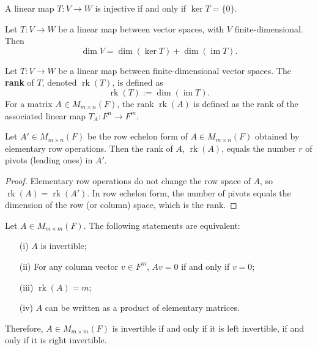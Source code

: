 \begin{proposition}
  A linear map $T: V \to W$ is injective if and only if $\ker T = \{0\}$.
\end{proposition}

\begin{theorem}
  Let $T: V \to W$ be a linear map between vector spaces, with $V$ finite-dimensional. Then
  \[
    \dim V = \dim (\ker T) + \dim (\operatorname{im} T).
  \]
\end{theorem}

\begin{definition}[Rank]
  Let $T: V \to W$ be a linear map between finite-dimensional vector spaces. The \textbf{rank} of $T$, denoted $\operatorname{rk}(T)$, is defined as
  \[
    \operatorname{rk}(T) := \dim(\operatorname{im} T).
  \]
  For a matrix $A \in M_{m \times n}(F)$, the rank $\operatorname{rk}(A)$ is defined as the rank of the associated linear map $T_A: F^n \to F^m$.
\end{definition}

\begin{proposition}
  Let $A' \in M_{m \times n}(F)$ be the row echelon form of $A \in M_{m \times n}(F)$ obtained by elementary row operations. Then the rank of $A$, $\operatorname{rk}(A)$, equals the number $r$ of pivots (leading ones) in $A'$.
\end{proposition}

\begin{proof}
  Elementary row operations do not change the row space of $A$, so $\operatorname{rk}(A) = \operatorname{rk}(A')$. In row echelon form, the number of pivots equals the dimension of the row (or column) space, which is the rank.
\end{proof}

\begin{proposition}
  Let $A \in M_{m \times m}(F)$. The following statements are equivalent:
  \begin{enumerate}
    \item[(i)] $A$ is invertible;
    \item[(ii)] For any column vector $v \in F^m$, $Av = 0$ if and only if $v = 0$;
    \item[(iii)] $\operatorname{rk}(A) = m$;
    \item[(iv)] $A$ can be written as a product of elementary matrices.
  \end{enumerate}
  Therefore, $A \in M_{m \times m}(F)$ is invertible if and only if it is left invertible, if and only if it is right invertible.
\end{proposition}

